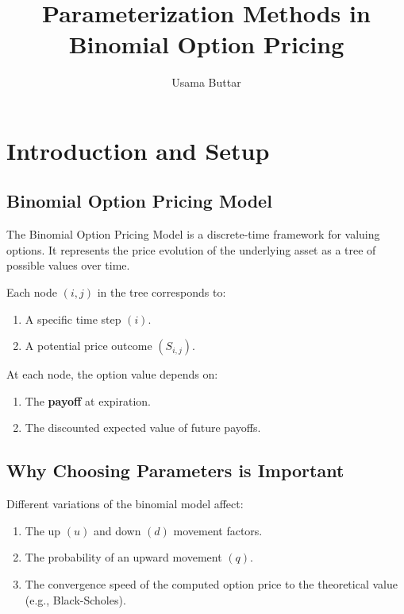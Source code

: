 \documentclass[11pt]{article}
\title{Parameterization Methods in Binomial Option Pricing}
\author{Usama Buttar}
\providecommand{\tightlist}{%
      \setlength{\itemsep}{0pt}\setlength{\parskip}{0pt}}
\begin{document}
    
    \maketitle
    
    

    
    \section{Introduction and Setup}\label{introduction-and-setup}

\subsection{Binomial Option Pricing
Model}\label{binomial-option-pricing-model}

The Binomial Option Pricing Model is a discrete-time framework for
valuing options. It represents the price evolution of the underlying
asset as a tree of possible values over time.

Each node \((i, j)\) in the tree corresponds to:
\begin{enumerate}
\tightlist
    \item A specific time step \((i)\).
    \item A potential price outcome \((S_{i,j})\).
\end{enumerate}

At each node, the option value depends on:
\begin{enumerate}
\tightlist
    \item The \textbf{payoff} at expiration.
    \item The discounted expected value of future payoffs.
\end{enumerate}

\subsection{Why Choosing Parameters is
Important}\label{why-choosing-parameters-is-important}

Different variations of the binomial model affect:
\begin{enumerate}
\tightlist
    \item The up \((u)\) and down \((d)\) movement factors.
    \item The probability of an upward movement \((q)\).
    \item The convergence speed of the computed option price to the
theoretical value (e.g., Black-Scholes).
\end{enumerate}
\end{document}

